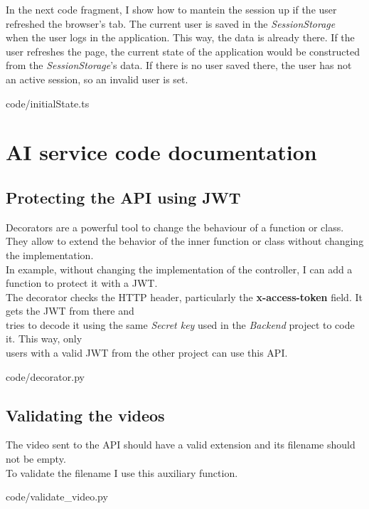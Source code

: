     In the next code fragment, I show how to mantein the session up if the user refreshed the browser's tab. The current user is saved in the \textit{SessionStorage} \\
    when the user logs in the application. This way, the data is already there. If the user refreshes the page, the current state of the application would be constructed \\
    from the \textit{SessionStorage}'s data. If there is no user saved there, the user has not an active session, so an invalid user is set.
    
    {code/initialState.ts}

\newpage
\section{AI service code documentation}
    \subsection{Protecting the API using JWT}
        Decorators \cite{Decorator} are a powerful tool to change the behaviour of a function or class. \\
        They allow to extend the behavior of the inner function or class without changing the implementation. \\

        In example, without changing the implementation of the controller, I can add a function to protect it with a JWT. \\
        The decorator checks the HTTP header, particularly the \textbf{x-access-token} field. It gets the JWT from there and \\
        tries to decode it using the same \textit{Secret key} used in the \textit{Backend} project to code it. This way, only \\
        users with a valid JWT from the other project can use this API.
        
        {code/decorator.py}

    \subsection{Validating the videos}
        The video sent to the API should have a valid extension and its filename should not be empty. \\
        To validate the filename I use this auxiliary function. 
        
        {code/validate_video.py}


